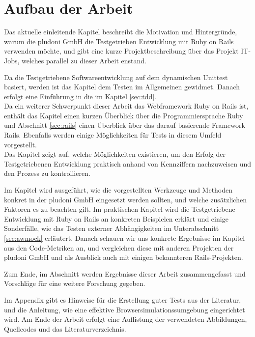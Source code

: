 \section{Aufbau der Arbeit}

Das aktuelle einleitende Kapitel beschreibt die Motivation und Hintergründe, warum die pludoni GmbH die Testgetrieben Entwicklung mit Ruby on Rails verwenden möchte, und gibt eine kurze Projektbeschreibung über das Projekt IT-Jobs, welches parallel zu dieser Arbeit enstand.

Da die Testgetriebene Softwareentwicklung auf dem dynamischen Unittest basiert, werden ist das Kapitel  dem Testen im Allgemeinen gewidmet. Danach erfolgt eine Einführung in die \textit{} im Kapitel \ref{sec:tdd}. \\
Da ein weiterer Schwerpunkt dieser Arbeit das Webframework Ruby on Rails ist, enthält das Kapitel  einen kurzen Überblick über die Programmiersprache Ruby und Abschnitt \ref{sec:rails} einen Überblick über das darauf basierende Framework Rails. Ebenfalls werden einige Möglichkeiten für Tests in diesem Umfeld vorgestellt.\\
Das Kapitel  zeigt auf, welche Möglichkeiten existieren, um den Erfolg der Testgetriebenen Entwicklung praktisch anhand von Kennziffern nachzuweisen und den Prozess zu kontrollieren.

Im Kapitel  wird ausgeführt, wie die vorgestellten Werkzeuge und Methoden konkret in der pludoni GmbH eingesetzt werden sollten, und welche zusätzlichen Faktoren es zu beachten gilt.
Im praktischen Kapitel  wird die Testgetriebene Entwicklung mit Ruby on Rails an konkreten Beispielen erklärt und einige Sonderfälle, wie das Testen externer Abhängigkeiten im Unterabschnitt \ref{sec:awmock} erläutert. 
Danach schauen wir uns konkrete Ergebnisse im Kapitel  aus den Code-Metriken an, und vergleichen diese mit anderen Projekten der pludoni GmbH und als Ausblick auch mit einigen bekannteren Rails-Projekten.

Zum Ende, im Abschnitt  werden Ergebnisse dieser Arbeit zusammengefasst und Vorschläge für eine weitere Forschung gegeben.

Im Appendix gibt es Hinweise für die Erstellung guter Tests aus der Literatur, und die Anleitung, wie eine effektive Browsersimulationssumgebung eingerichtet wird. Am Ende der Arbeit erfolgt eine Auflistung der verwendeten Abbildungen, Quellcodes und das Literaturverzeichnis.

